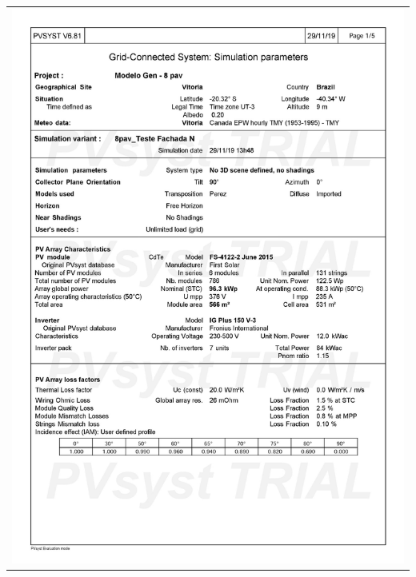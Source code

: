 \begin{table}[H]
    \centering
    \begin{tabular}{l}
        \includegraphics[width=\textwidth]{figures/attachments/resultpv5.jpg}
    \end{tabular}
\end{table}
\pagebreak
